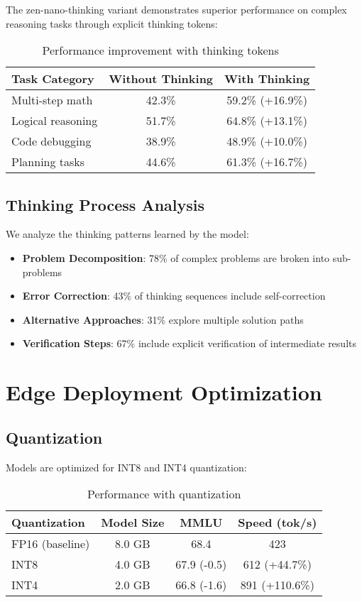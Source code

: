 \documentclass[11pt,a4paper]{article}
\begin{document}
The zen-nano-thinking variant demonstrates superior performance on complex reasoning tasks through explicit thinking tokens:

\begin{table}[h]
\centering
\caption{Performance improvement with thinking tokens}
\begin{tabular}{lcc}
\toprule
Task Category & Without Thinking & With Thinking \\
\midrule
Multi-step math & 42.3\% & 59.2\% (+16.9\%) \\
Logical reasoning & 51.7\% & 64.8\% (+13.1\%) \\
Code debugging & 38.9\% & 48.9\% (+10.0\%) \\
Planning tasks & 44.6\% & 61.3\% (+16.7\%) \\
\bottomrule
\end{tabular}
\end{table}

\subsection{Thinking Process Analysis}

We analyze the thinking patterns learned by the model:

\begin{itemize}
    \item \textbf{Problem Decomposition}: 78\% of complex problems are broken into sub-problems
    \item \textbf{Error Correction}: 43\% of thinking sequences include self-correction
    \item \textbf{Alternative Approaches}: 31\% explore multiple solution paths
    \item \textbf{Verification Steps}: 67\% include explicit verification of intermediate results
\end{itemize}

\section{Edge Deployment Optimization}

\subsection{Quantization}

Models are optimized for INT8 and INT4 quantization:

\begin{table}[h]
\centering
\caption{Performance with quantization}
\begin{tabular}{lccc}
\toprule
Quantization & Model Size & MMLU & Speed (tok/s) \\
\midrule
FP16 (baseline) & 8.0 GB & 68.4 & 423 \\
INT8 & 4.0 GB & 67.9 (-0.5) & 612 (+44.7\%) \\
INT4 & 2.0 GB & 66.8 (-1.6) & 891 (+110.6\%) \\
\bottomrule
\end{tabular}
\end{table}
\end{document}
